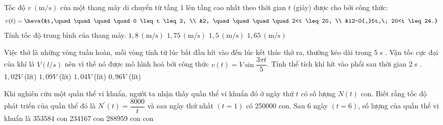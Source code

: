 \begin{ex}%
	Tốc độ $v~(\mathrm{m}/s)$ của một thang máy di chuyển từ tầng 1 lên tầng cao nhất theo thời gian $t$ (giây) được cho bởi công thức:
	$$v(t)=\heva{&t,\quad\quad\quad\quad 0 \leq t \leq 2, \\
		&2, \quad\quad\quad\quad 2<t \leq 20, \\
		&12-0{,}5t,\; 20<t \leq 24.}$$
	Tính tốc độ trung bình của thang máy.
	\choice
	{$1{,}8 \,(\mathrm{m/s})$}
	{$1{,}75 \,(\mathrm{m/s})$}
	{$1{,}5 \,(\mathrm{m/s})$}
	{$1{,}65 \,(\mathrm{m/s})$}
\end{ex}

\begin{ex}
	Việc thở là những vòng tuần hoàn, mỗi vòng tính từ lúc bắt đầu hít vào đến lúc kết thúc thở ra, thường kéo dài trong 5 s . Vận tốc cực đại của khí là $V(l / s)$ nên vì thế nó được mô hình hoá bởi công thức $v(t)=V \sin \dfrac{3 \pi t}{5}$. Tính thể tích khí hít vào phổi sau thời gian 2 s .
	\choice
	{$1,02V$ (lít)}
	{$1,09V$ (lít)}
	{$1,04V$ (lít)}
	{\True $0,96V$ (lít)}
\end{ex}
\begin{ex}
	Khi nghiên cứu một quần thể vi khuẩn, người ta nhận thấy quần thể vi khuẩn đó ở ngày thứ $t$ có số lượng $N(t)$ con. Biết rằng tốc độ phát triển của quần thể đó là $N^{\prime}(t)=\dfrac{8000}{t}$ và sau ngày thứ nhất $(t=1)$ có 250000 con. Sau 6 ngày $(t=6)$, số lượng của quần thể vi khuẩn là
	\choice
	{353584 con}
	{234167 con}
	{288959 con}
	{ con}
\end{ex}

